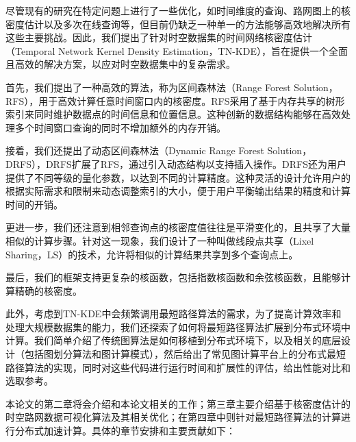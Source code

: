 尽管现有的研究在特定问题上进行了一些优化，如时间维度的查询、路网图上的核密度估计以及多次在线查询等，但目前仍缺乏一种单一的方法能够高效地解决所有这些主要挑战。因此，我们提出了针对时空数据集的时间网络核密度估计（Temporal Network Kernel Density Estimation，TN-KDE），旨在提供一个全面且高效的解决方案，以应对时空数据集中的复杂需求。

首先，我们提出了一种高效的算法，称为区间森林法（Range Forest Solution，RFS），用于高效计算任意时间窗口内的核密度。RFS采用了基于内存共享的树形索引来同时维护数据点的时间信息和位置信息。这种创新的数据结构能够在高效处理多个时间窗口查询的同时不增加额外的内存开销。

接着，我们还提出了动态区间森林法（Dynamic Range Forest Solution，DRFS），DRFS扩展了RFS，通过引入动态结构以支持插入操作。DRFS还为用户提供了不同等级的量化参数，以达到不同的计算精度。这种灵活的设计允许用户的根据实际需求和限制来动态调整索引的大小，便于用户平衡输出结果的精度和计算时间的开销。

更进一步，我们还注意到相邻查询点的核密度值往往是平滑变化的，且共享了大量相似的计算步骤。针对这一现象，我们设计了一种叫做线段点共享（Lixel Sharing，LS）的技术，允许将相似的计算结果共享到多个查询点上。

最后，我们的框架支持更复杂的核函数，包括指数核函数和余弦核函数，且能够计算精确的核密度。

此外，考虑到TN-KDE中会频繁调用最短路径算法的需求，为了提高计算效率和处理大规模数据集的能力，我们还探索了如何将最短路径算法扩展到分布式环境中计算。我们简单介绍了传统图算法是如何移植到分布式环境下，以及相关的底层设计（包括图划分算法和图计算模式），然后给出了常见图计算平台上的分布式最短路径算法的实现，同时对这些代码进行运行时间和扩展性的评估，给出性能对比和选取参考。

本论文的第二章将会介绍和本论文相关的工作；第三章主要介绍基于核密度估计的时空路网数据可视化算法及其相关优化；在第四章中则针对最短路径算法的计算进行分布式加速计算。具体的章节安排和主要贡献如下：

